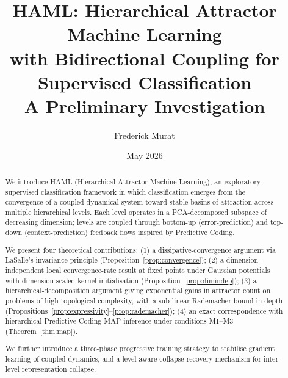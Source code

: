 \documentclass[11pt,a4paper]{article}
\title{HAML: Hierarchical Attractor Machine Learning\\
with Bidirectional Coupling for Supervised Classification\\[0.5em]
\large A Preliminary Investigation}
\author{Frederick Murat}
\affil{Independent Researcher \\ \texttt{contact via GitHub: ikobootloader}}
\date{May 2026}
\begin{document}
\maketitle

\begin{abstract}
We introduce HAML (Hierarchical Attractor Machine Learning), an exploratory supervised
classification framework in which classification emerges from the convergence of a coupled
dynamical system toward stable basins of attraction across multiple hierarchical levels.
Each level operates in a PCA-decomposed subspace of decreasing dimension; levels are coupled
through bottom-up (error-prediction) and top-down (context-prediction) feedback flows
inspired by Predictive Coding.

We present four theoretical contributions:
(1) a dissipative-convergence argument via LaSalle's invariance principle (Proposition~\ref{prop:convergence});
(2) a dimension-independent local convergence-rate result at fixed points under Gaussian
potentials with dimension-scaled kernel initialisation (Proposition~\ref{prop:dimindep});
(3) a hierarchical-decomposition argument giving exponential gains in attractor count
on problems of high topological complexity, with a sub-linear Rademacher bound in depth
(Propositions~\ref{prop:expressivity}--\ref{prop:rademacher});
(4) an exact correspondence with hierarchical Predictive Coding MAP inference under
conditions M1--M3 (Theorem~\ref{thm:map}).

We further introduce a three-phase progressive training strategy to stabilise gradient
learning of coupled dynamics, and a level-aware collapse-recovery mechanism for inter-level
representation collapse.


\end{abstract}
\end{document}
